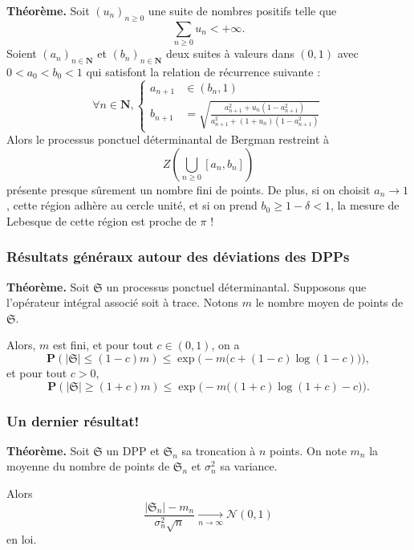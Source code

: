 \documentclass[9pt]{beamer}
\begin{document}
\begin{frame}
    \textbf{Théorème.} Soit \( (u_n)_{n \geqslant 0} \) une suite de nombres positifs telle que  
\[ 
    \sum_{n \ge 0} u_n < +\infty. 
\]  
Soient \( (a_n)_{n \in \mathbf{N}} \) et \( (b_n)_{n \in \mathbf{N}} \) deux suites à valeurs dans \( (0,1) \) avec \( 0 < a_0 < b_0 < 1 \) qui satisfont la relation de récurrence suivante :  
\[
\forall n \in \mathbf{N}, 
\left\{
\begin{aligned}
    a_{n+1} &\in (b_n, 1) \\[6pt]
    b_{n+1} &= \sqrt{ \frac{a_{n+1}^2 + u_n (1 - a_{n+1}^2)}{a_{n+1}^2 + (1 + u_n)(1 - a_{n+1}^2)} }
\end{aligned}
\right.
\]
Alors le processus ponctuel déterminantal de Bergman restreint à  
\[
    Z\left( \bigcup_{n \ge 0} [a_n, b_n] \right)
\]
présente presque sûrement un nombre fini de points. De plus, si on choisit $ a_n \to 1 $, cette région adhère au cercle unité, et si on prend $ b_0 \geqslant 1 - \delta < 1 $, la mesure de Lebesque de cette région est proche de $ \pi $ !

\end{frame}\begin{frame}\frametitle{Résultats généraux autour des déviations des DPPs}

    \textbf{Théorème.} Soit \(\mathfrak{S}\) un processus ponctuel déterminantal. Supposons que l'opérateur intégral associé soit à trace. Notons \(m\) le nombre moyen de points de \(\mathfrak{S}\). 
    
    Alors, \(m\) est fini, et pour tout \(c \in (0,1)\), on a  
    \[
        \mathbf{P}(|\mathfrak{S}| \leqslant (1-c)m) \leqslant \exp\big(-m \big(c + (1-c) \log(1-c)\big)\big),
    \]
    et pour tout \(c > 0\),  
    \[
        \mathbf{P}(|\mathfrak{S}| \geqslant (1+c)m) \leqslant \exp\big(-m \big((1+c) \log(1+c) - c\big)\big).
    \]

\end{frame}\begin{frame}\frametitle{Un dernier résultat!}

    \textbf{Théorème.} Soit $ \mathfrak S$ un DPP et $ \mathfrak S_n $ sa troncation à $n$ points. On note $ m_n $ la moyenne du nombre de points de $ \mathfrak S_n $ et $ \sigma^2_n $ sa variance. 

    Alors 
    \[
        \frac{| \mathfrak S_n | - m_n }{\sigma_n^2\sqrt n} \xrightarrow[n \to \infty]{} \mathcal N (0,1)
    \]
    en loi.

\end{frame}
\end{document}
